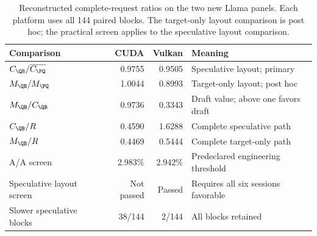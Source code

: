 \begin{table}[t]\centering\small
\caption{Reconstructed complete-request ratios on the two new Llama panels. Each platform uses all 144 paired blocks. The target-only layout comparison is post hoc; the practical screen applies to the speculative layout comparison.}
\label{tab:costs}
\begin{tabularx}{\textwidth}{@{}lrrY@{}}\toprule
Comparison & CUDA & Vulkan & Meaning\\\midrule
$C_{\QB}/\overline{C_{\PQ}}$ & 0.9755 & 0.9505 & Speculative layout; primary\\
$M_{\QB}/M_{\PQ}$ & 1.0044 & 0.8993 & Target-only layout; post hoc\\
$M_{\QB}/C_{\QB}$ & 0.9736 & 0.3343 & Draft value; above one favors draft\\
$C_{\QB}/R$ & 0.4590 & 1.6288 & Complete speculative path\\
$M_{\QB}/R$ & 0.4469 & 0.5444 & Complete target-only path\\
A/A screen & 2.983\% & 2.942\% & Predeclared engineering threshold\\
Speculative layout screen & Not passed & Passed & Requires all six sessions favorable\\
Slower speculative blocks & 38/144 & 2/144 & All blocks retained\\\bottomrule
\end{tabularx}\end{table}
